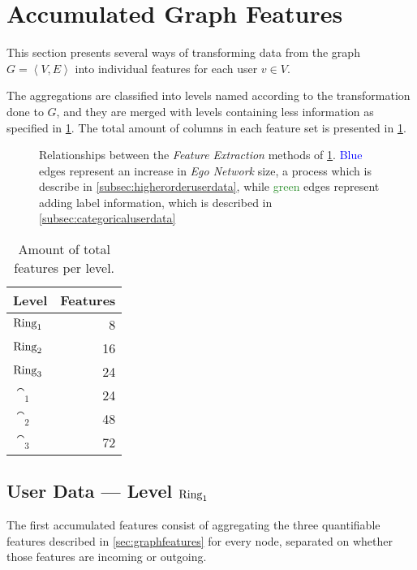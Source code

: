 \section{Accumulated Graph Features}
\label{sec:accumulatedfeatures}

This section presents several ways of transforming data from the graph $G = \left< V, E \right>$ into individual features for each user $v \in V$.

The aggregations are classified into levels named according to the transformation done to $G$, and they are merged with levels containing less information as specified in \cref{fig:mlrelationships}. The total amount of columns in each feature set is presented in \cref{tab:features}.

\begin{figure}[h]
\centering
\resizebox{!}{.2\textheight}{%
	\framebox{%
		
	}
}
\caption{Relationships between the \emph{Feature Extraction} methods of \cref{sec:accumulatedfeatures}. \textcolor{Blue}{Blue} edges represent an increase in \emph{Ego Network} size, a process which is describe in \cref{subsec:higherorderuserdata}, while \textcolor{ForestGreen}{green} edges represent adding label information, which is described in \cref{subsec:categoricaluserdata}}
\label{fig:mlrelationships}
\end{figure}

\begin{table}[h]
\centering
\begin{tabular}{>{\bfseries}l r}
\toprule
Level & Features \\
\midrule
$\operatorname{Ring}_1$ & \num{8}  \\
$\operatorname{Ring}_2$ & \num{16} \\
$\operatorname{Ring}_3$ & \num{24} \\
$\cat_1$ & \num{24} \\
$\cat_2$ & \num{48} \\
$\cat_3$ & \num{72} \\
\bottomrule
\end{tabular}
\caption{Amount of total features per level.}
\label{tab:features}
\end{table}


\subsection{User Data --- Level $\operatorname{Ring}_1$}
\label{subsec:user_data}

The first accumulated features consist of aggregating the three quantifiable features described in \cref{sec:graphfeatures} for every node, separated on whether those features are incoming or outgoing.

